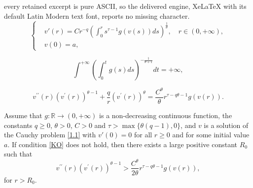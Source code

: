 \documentclass[10pt,a4paper]{amsart}
\begin{document}
every retained excerpt is pure ASCII, so the delivered engine, XeLaTeX with its default Latin Modern text font, reports no missing character.
	\begin{equation}\label{1.1}
	\left\{
	\begin{aligned}
	&v'(r)= C  r^{-q}  \left(  \int_{0}^{r} s^{\tau-1} g (v(s))ds \right )^{\frac{1}{\theta}}, \quad r\in (0, +\infty), \\
	&v(0)=a,
	\end{aligned}
	\right.
	\end{equation}

	\begin{equation}\label{KO}
	\int^{+\infty} \left ( \int_0^t g(s)ds \right )^{-\frac{1}{\theta+1}} dt = + \infty,
	\end{equation}

\begin{equation}\label{3.1}
v^{\prime\prime}(r)\left( v^{\prime}(r)\right)^{\theta -1}+\frac{q}{r}\left( v^{\prime}(r)\right)^{\theta}
=\frac{C^\theta}{\theta} r^{\tau - q \theta -1} g(v(r)).
\end{equation}

\begin{Lemma}\label{Lem 3.1}
Assume that $g: \mathbb{R} \to (0,+\infty)$ is a non-decreasing continuous function, the constants $q\ge 0$, $\theta> 0$, $C>0$ and $\tau > \max \{\theta (q-1), 0\}$, and $v$ is a solution of the Cauchy problem \eqref{1.1} with $v'(0)=0$ for all $r\ge 0$ and for some initial value $a$.
If condition \eqref{KO} does not hold, then there exists a large positive constant $R_0$ such that
\begin{equation}\label{claim}
v^{\prime\prime}(r)\left( v^{\prime}(r)\right)^{\theta -1} > \frac{C^\theta}{2\theta} r^{\tau - q \theta -1} g(v(r)),
\end{equation}
for $r>R_0$.
\end{Lemma}
\end{document}
